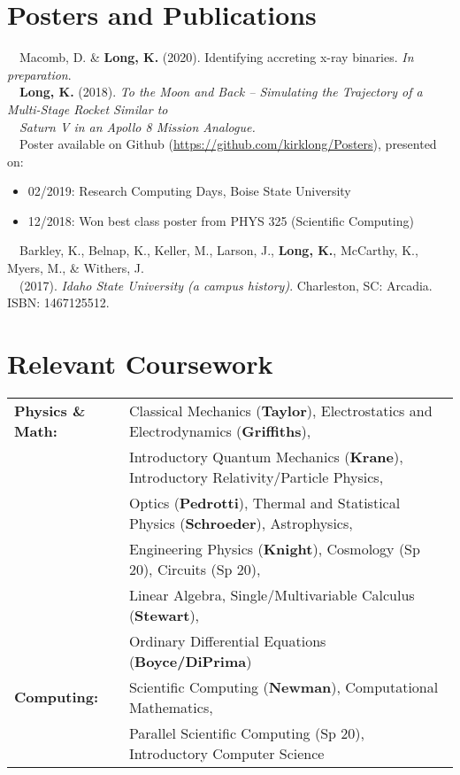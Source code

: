 \documentclass[11pt]{article}
\begin{document}
\section{Posters and Publications}
\-\ \-\ Macomb, D. \& \textbf{Long, K.} (2020). Identifying accreting x-ray binaries. \textit{In preparation}.\vspace{1mm} \\
\-\ \-\ \textbf{Long, K.} (2018). \textit{To the Moon and Back -- Simulating the Trajectory of a Multi-Stage Rocket Similar to} \\
\-\ \-\ \textit{Saturn V in an Apollo 8 Mission Analogue.}\vspace{1mm}\\
\-\ \-\ Poster available on Github (\url{https://github.com/kirklong/Posters}), presented on:
\-\ \-\ \begin{itemize}[noitemsep]
              \item 02/2019: Research Computing Days, Boise State University
              \item 12/2018: Won best class poster from PHYS 325 (Scientific Computing)
        \end{itemize}
\-\ \-\ Barkley, K., Belnap, K., Keller, M., Larson, J., \textbf{Long, K.}, McCarthy, K., Myers, M., \& Withers, J. \\
 \-\ \-\ (2017). \textit{Idaho State University (a campus history)}. Charleston, SC: Arcadia. ISBN: 1467125512.

\section{Relevant Coursework}
\begin{tabular}{ll}
\textbf{Physics \& Math:} &   Classical Mechanics (\textbf{Taylor}), Electrostatics and Electrodynamics (\textbf{Griffiths}), \\
                  &   Introductory Quantum Mechanics (\textbf{Krane}), Introductory Relativity/Particle Physics, \\
                  &   Optics (\textbf{Pedrotti}), Thermal and Statistical Physics (\textbf{Schroeder}), Astrophysics,\\
                  &   Engineering Physics (\textbf{Knight}), Cosmology (Sp 20), Circuits (Sp 20),\\
                  &   Linear Algebra, Single/Multivariable Calculus (\textbf{Stewart}),\\
                  & Ordinary Differential Equations (\textbf{Boyce/DiPrima}) \vspace{1mm} \\
\textbf{Computing:} &   Scientific Computing (\textbf{Newman}), Computational Mathematics, \\
                    &   Parallel Scientific Computing (Sp 20), Introductory Computer Science\vspace{1mm}

\end{tabular}
\end{document}

